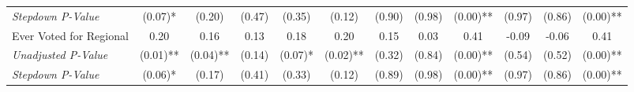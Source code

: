 \begin{tabular}{l c c c c c c c c c c c}
\quad \textit{Stepdown P-Value} & (0.07)* & (0.20) & (0.47) & (0.35) & (0.12) & (0.90) & (0.98) & (0.00)** & (0.97) & (0.86) & (0.00)** \\
Ever Voted for Regional & 0.20 & 0.16 & 0.13 & 0.18 & 0.20 & 0.15 & 0.03 & 0.41 & -0.09 & -0.06 & 0.41 \\
\quad \textit{Unadjusted P-Value} & (0.01)** & (0.04)** & (0.14) & (0.07)* & (0.02)** & (0.32) & (0.84) & (0.00)** & (0.54) & (0.52) & (0.00)** \\
\quad \textit{Stepdown P-Value} & (0.06)* & (0.17) & (0.41) & (0.33) & (0.12) & (0.89) & (0.98) & (0.00)** & (0.97) & (0.86) & (0.00)** \\
\bottomrule
\end{tabular}
